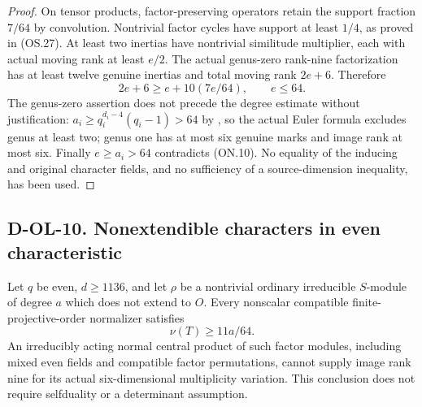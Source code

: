\begin{proof}
On tensor products, factor-preserving operators retain the
support fraction $7/64$ by convolution.  Nontrivial factor cycles
have support at least $1/4$, as proved in (OS.27).  At least two
inertias have nontrivial similitude multiplier, each with actual
moving rank at least $e/2$.  The actual genus-zero rank-nine
factorization has at least twelve genuine inertias and total
moving rank $2e+6$.  Therefore
\[
                      2e+6\ge e+10(7e/64),\qquad e\le64.
                                                               \tag{ON.10}
\]
The genus-zero assertion does not precede the degree estimate
without justification: $a_i\ge q_i^{d_i-4}(q_i-1)>64$ by
\cite[Theorem~3.7, pp.~165--167]{OL:GLT2024}, so the actual Euler
formula excludes genus at least two; genus one has at most six
genuine marks and image rank at most six.  Finally $e\ge a_i>64$
contradicts (ON.10).  No equality of the inducing and original
character fields, and no sufficiency of a source-dimension
inequality, has been used.
\end{proof}

\subsection*{D-OL-10. Nonextendible characters in even characteristic}

\begin{theorem}[D-OL-10]
\label{D-OL-10}
Let $q$ be even, $d\ge1136$, and let $\rho$ be a nontrivial
ordinary irreducible $S$-module of degree $a$ which does not extend
to $O$.  Every nonscalar compatible finite-projective-order
normalizer satisfies
\[
                           \nu(T)\ge11a/64.                 \tag{ON.11}
\]
An irreducibly acting normal central product of such factor
modules, including mixed even fields and compatible factor
permutations, cannot supply image rank nine for its actual
six-dimensional multiplicity variation.  This conclusion does
not require selfduality or a determinant assumption.
\end{theorem}

